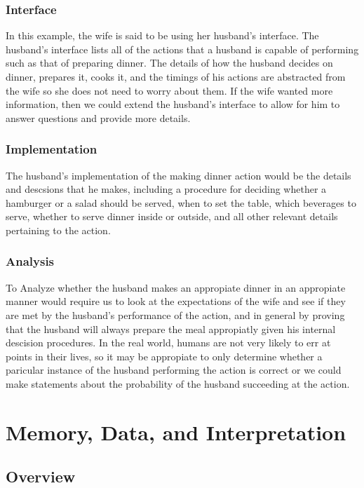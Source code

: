 \documentclass[12pt, letterpaper]{book}
\begin{document}
	\subsection{Interface}

		In this example, the wife is said to be using her husband's interface. The husband's interface lists all of the actions that a husband is capable of performing such as that of preparing dinner. The details of how the husband decides on dinner, prepares it, cooks it, and the timings of his actions are abstracted from the wife so she does not need to worry about them. If the wife wanted more information, then we could extend the husband's interface to allow for him to answer questions and provide more details.

	\subsection{Implementation}

	The husband's implementation of the making dinner action would be the details and descsions that he makes, including a procedure for deciding whether a hamburger or a salad should be served, when to set the table, which beverages to serve, whether to serve dinner inside or outside, and all other relevant details pertaining to the action.

	\subsection{Analysis}

	To Analyze whether the husband makes an appropiate dinner in an appropiate manner would require us to look at the expectations of the wife and see if they are met by the husband's performance of the action, and in general by proving that the husband will always prepare the meal appropiatly given his internal descision procedures. In the real world, humans are not very likely to err at points in their lives, so it may be appropiate to only determine whether a paricular instance of the husband performing the action is correct or we could make statements about the probability of the husband succeeding at the action.


\chapter{Memory, Data, and Interpretation} \label{memory}

	\section{Overview}
\end{document}
